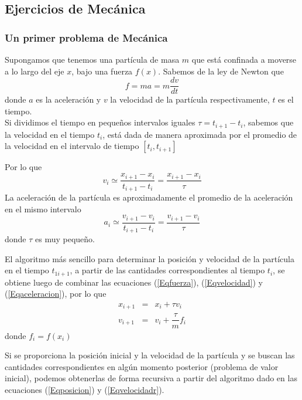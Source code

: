 \subsection{Ejercicios de Mecánica}
\begin{frame}
\frametitle{Un primer problema de Mecánica}
Supongamos que tenemos una partícula de masa $m$ que está confinada a moverse a lo largo del eje $x$, bajo una fuerza $f(x)$. Sabemos de la ley de Newton que
\begin{equation}\label{Eqfuerza}
f = ma = m \dfrac{dv}{dt}
\end{equation}
donde $a$ es la aceleración y $v$ la velocidad de la partícula respectivamente, $t$ es el tiempo.
\\
\medskip
Si dividimos el tiempo en pequeños intervalos iguales $\tau = t_{i+1} - t_{i}$, sabemos que la velocidad en el tiempo $t_{i}$, está dada de manera aproximada por el promedio de la velocidad en el intervalo de tiempo $[t_{i}, t_{i+1}]$
\end{frame}
\begin{frame}
Por lo que
\begin{equation}\label{Eqvelocidad}
v_{i} \simeq \dfrac{x_{i+1}-x_{i}}{t_{i+1}-t_{i}} = \dfrac{x_{i+1}-x_{i}}{\tau}
\end{equation}
La aceleración de la partícula es aproximadamente el promedio de la aceleración en el mismo intervalo
\begin{equation}\label{Eqaceleracion}
a_{i} \simeq \dfrac{v_{i+1}-v_{i}}{t_{i+1}-t_{i}} = \dfrac{v_{i+1}-v_{i}}{\tau}
\end{equation}
donde $\tau$ es muy pequeño.
\end{frame}
\begin{frame}
El algoritmo más sencillo para determinar la posición y velocidad de la partícula en el tiempo $t_{1i+1}$, a partir de las cantidades correspondientes al tiempo $t_{i}$, se obtiene luego de combinar las ecuaciones (\ref{Eqfuerza}), (\ref{Eqvelocidad}) y (\ref{Eqaceleracion}), por lo que
\begin{eqnarray}
x_{i+1} &=& x_{i} + \tau v_{i} \label{Eqposicion} \\
v_{i+1} &=& v_{i} + \dfrac{\tau}{m} f_{i} \label{Eqvelocidadr}
\end{eqnarray}
donde $f_{i} = f(x_{i})$
\end{frame}
\begin{frame}
Si se proporciona la posición inicial y la velocidad de la partícula y se buscan las cantidades correspondientes en algún momento posterior (problema de valor inicial), podemos obtenerlas de forma recursiva a partir del algoritmo dado en las ecuaciones (\ref{Eqposicion}) y (\ref{Eqvelocidadr}).
\end{frame}
